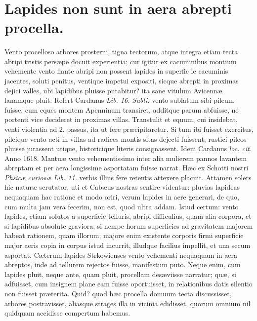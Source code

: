 \documentclass[a4paper, 11pt, oneside, polutonikogreek, latin]{article}
\begin{document}
\section[Lapides non sunt in aera abrepti procella.]{\bfseries{Lapides non sunt in aera abrepti procella.}}
\paragraph{}
Vento procelloso arbores prosterni, tigna tectorum, atque integra etiam tecta abripi tristis persæpe docuit experientia; cur igitur ex cacuminibus montium vehemente vento flante abripi non possent lapides in superfic ie cacuminis jacentes, soluti penitus, ventique impetui expositi, sicque abrepti in proximas dejici valles, ubi lapidibus pluisse putabitur? ita sane vitulum Avicennæ lanamque pluit: Refert Cardanus \emph{Lib. 16. Subti.} vento sublatum sibi pileum fuisse, cum eques montem Apenninum transiret, additque parum abfuisse, ne portenti vice decideret in proximas villas. Transtulit et equum, cui insidebat, venti violentia ad 2. passus, ita ut fere præcipitaretur. Si tum ibi fuisset exercitus, pileique vento acti in villas ad radices montis sitas dejecti fuissent, rustici pileos pluisse jurassent utique, historicique literis consignassent. Idem Cardanus \emph{loc. cit.} Anno 1618. Mantuæ vento vehementissimo inter alia mulierem pannos lavantem abreptam et per aera longissime asportatam fuisse narrat. Hæc ex Schotti nostri \emph{Phsicæ curiosæ Lib. 11.} verbis illius fere retentis attexere placuit. Attamen solers hic naturæ scrutator, uti et Cabæus nostras sentire videntur: pluvias lapideas nequaquam hac ratione et modo oriri, verum lapides in aere generari, de quo, cum multa jam vera fecerim, non est, quod ultra addam. Istud certum: vento lapides, etiam solutos a superficie telluris, abripi difficulius, quam alia corpora, et si lapidibus absolute graviora, si nempe horum superficies ad gravitatem majorem habeat rationem, quam illorum; majore enim existente corporis firmi superficie major aeris copia in corpus istud incurrit, illudque facilius impellit, et una secum asportat. Cæterum lapides Strkowienses vento vehementi nequaquam in aera abreptos, inde ad tellurem rejectos fuisse, manifestum puto. Neque enim, cum lapides pluit, neque ante, quam pluit, procellam desæviisse narratur; quæ, si adfuisset, cum insignem plane eam fuisse oportuisset, in relationibus datis silentio non fuisset præterita. Quid? quod hæc procella domuum tecta discussisset, arbores postravisset, aliasque strages illa in vicinia edidisset, quorum omnium nil quidquam accidisse compertum habemus.
\clearpage
\end{document}
